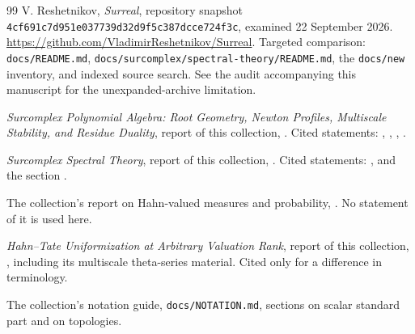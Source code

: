 \documentclass[11pt]{article}
\numberwithin{equation}{section}
\theoremstyle{definition}
\theoremstyle{remark}
\begin{document}
\begin{thebibliography}{99}
V. Reshetnikov,
\emph{Surreal}, repository snapshot
\texttt{4cf691c7d951e037739d32d9f5c387dcce724f3c},
examined 22 September 2026.
\url{https://github.com/VladimirReshetnikov/Surreal}.
Targeted comparison: \texttt{docs/README.md},
\texttt{docs/surcomplex/spectral-theory/README.md},
the \texttt{docs/new} inventory, and indexed source search.
See the audit accompanying this manuscript for the unexpanded-archive limitation.

\emph{Surcomplex Polynomial Algebra: Root Geometry, Newton Profiles,
Multiscale Stability, and Residue Duality}, report of this collection,
.
Cited statements: ,
, ,
.

\emph{Surcomplex Spectral Theory}, report of this collection,
.
Cited statements: ,  and the section
.

The collection's report on Hahn-valued measures and probability,
.
No statement of it is used here.

\emph{Hahn--Tate Uniformization at Arbitrary Valuation Rank}, report of this
collection, , including its
multiscale theta-series material. Cited only for a difference in terminology.

The collection's notation guide, \texttt{docs/NOTATION.md}, sections on scalar
standard part and on topologies.

\end{thebibliography}
\end{document}
